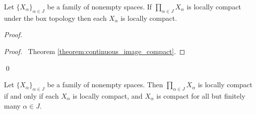 \begin{proposition}
    Let $\{ X_\alpha \}_{\alpha \in J}$ be a family of nonempty spaces. If
    $\prod_{\alpha \in J} X_\alpha$ is locally compact under the box topology then each $X_\alpha$ is
    locally compact.
\end{proposition}

\begin{proof}
    \pf
    \begin{proof}
        \pf\ Theorem \ref{theorem:continuous_image_compact}.
    \end{proof}
    \qed
\end{proof}

\begin{proposition}[AC]
    Let $\{ X_\alpha \}_{\alpha \in J}$ be a family of nonempty spaces. Then
    $\prod_{\alpha \in J} X_\alpha$ is locally compact if and only if each $X_\alpha$ is locally compact,
    and $X_\alpha$ is compact for all but finitely many $\alpha \in J$.
\end{proposition}

